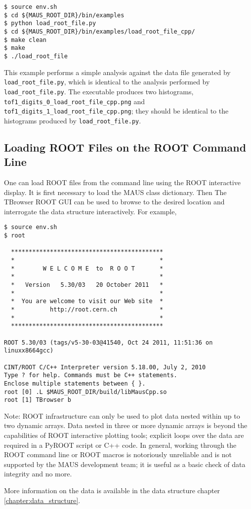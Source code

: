 \begin{verbatim}
$ source env.sh
$ cd ${MAUS_ROOT_DIR}/bin/examples
$ python load_root_file.py
$ cd ${MAUS_ROOT_DIR}/bin/examples/load_root_file_cpp/
$ make clean
$ make
$ ./load_root_file
\end{verbatim}

This example performs a simple analysis against the data file generated by \verb|load_root_file.py|, which is identical to the analysis performed by \verb|load_root_file.py|. The executable produces two histograms, \verb|tof1_digits_0_load_root_file_cpp.png| and \verb|tof1_digits_1_load_root_file_cpp.png|; they should be identical to the histograms produced by \verb|load_root_file.py|.

\subsection{Loading ROOT Files on the ROOT Command Line}
One can load ROOT files from the command line using the ROOT interactive display. It is first necessary to load the MAUS class dictionary. Then The TBrowser ROOT GUI can be used to browse to the desired location and interrogate the data structure interactively. For example,

\begin{verbatim}
$ source env.sh
$ root

  *******************************************
  *                                         *
  *        W E L C O M E  to  R O O T       *
  *                                         *
  *   Version   5.30/03   20 October 2011   *
  *                                         *
  *  You are welcome to visit our Web site  *
  *          http://root.cern.ch            *
  *                                         *
  *******************************************

ROOT 5.30/03 (tags/v5-30-03@41540, Oct 24 2011, 11:51:36 on linuxx8664gcc)

CINT/ROOT C/C++ Interpreter version 5.18.00, July 2, 2010
Type ? for help. Commands must be C++ statements.
Enclose multiple statements between { }.
root [0] .L $MAUS_ROOT_DIR/build/libMausCpp.so
root [1] TBrowser b
\end{verbatim}

Note: ROOT infrastructure can only be used to plot data nested within up to two dynamic arrays. Data nested in three or more dynamic arrays is beyond the capabilities of ROOT interactive plotting tools; explicit loops over the data are required in a PyROOT script or C++ code. In general, working through the ROOT command line or ROOT macros is notoriously unreliable and is not supported by the MAUS development team; it is useful as a basic check of data integrity and no more.

More information on the data is available in the data structure chapter \ref{chapter:data_structure}.

